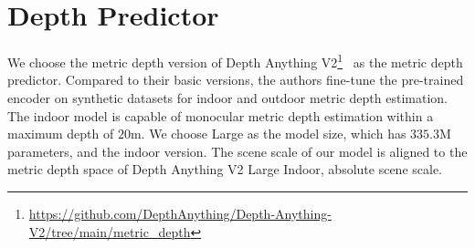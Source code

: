 

\section{Depth Predictor}

We choose the metric depth version of Depth Anything V2\footnote{\url{https://github.com/DepthAnything/Depth-Anything-V2/tree/main/metric_depth}}~\cite{depth_anything_v2} as the metric depth predictor.
Compared to their basic versions, the authors fine-tune the pre-trained encoder on synthetic datasets for indoor and outdoor metric depth estimation.
The indoor model is capable of monocular metric depth estimation within a maximum depth of \(20\)m.
We choose Large as the model size, which has \(335.3\)M parameters, and the indoor version.
The scene scale of our model is aligned to the metric depth space of Depth Anything V2 Large Indoor, \ie absolute scene scale.

